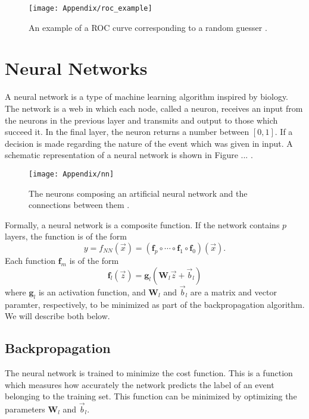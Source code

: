 \documentclass[10pt,a4paper]{book}
\begin{document}
\begin{figure}
\centering
\texttt{[image: Appendix/roc\_example]}
\caption{An example of a ROC curve corresponding to a random guesser \cite{burkov2019hundred}.}
\label{roc example}
\end{figure}

\section{Neural Networks}
A neural network is a type of machine learning algorithm inspired by biology. The network is a web in which each node, called a neuron, receives an input from the neurons in the previous layer and transmits and output to those which succeed it. In the final layer, the neuron returns a number between $[0,1]$. If  a decision is made regarding the nature of the event which was given in input.  A schematic representation of a neural network is shown in Figure ... .
\begin{figure}
\centering
\texttt{[image: Appendix/nn]}
\caption{The neurons composing an artificial neural network and the connections between them \cite{nn_image}.}
\end{figure}

Formally, a neural network is a composite function. If the network contains $p$ layers, the function is of the form
\begin{equation}
y = f_{NN}(\vec{x}) = \left( \mathbf{f}_p \circ \cdots \circ \mathbf{f}_1 \circ \mathbf{f}_0\right) (\vec{x}).
\label{NN equation}
\end{equation}
Each function $\mathbf{f}_m$ is of the form
\begin{equation}
\mathbf{f}_l (\vec{z}) = \mathbf{g}_l \left(\mathbf{W}_l\vec{z} + \vec{b}_l \right)
\label{activation function}
\end{equation}
where $\mathbf{g}_l$ is an activation function, and $\mathbf{W}_l$ and $\vec{b}_l$ are a matrix and vector paramter, respectively, to be minimized as part of the backpropagation algorithm. We will describe both below. 

\subsection{Backpropagation}
The neural network is trained to minimize the cost function. This is a function which measures how accurately the network predicts the label of an event belonging to the training set. This function can be minimized by optimizing the parameters $\mathbf{W}_l$ and $\vec{b}_l$. 
\end{document}
